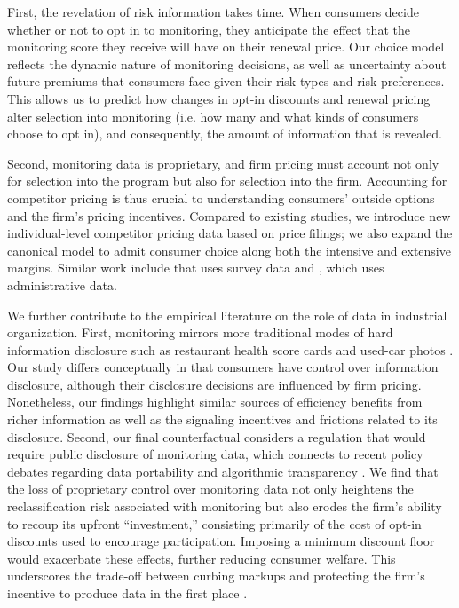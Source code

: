 First, the revelation of risk information takes time. When consumers decide whether or not to opt in to monitoring, they anticipate the effect that the monitoring score they receive will have on their renewal price. Our choice model reflects the dynamic nature of monitoring decisions, as well as uncertainty about future premiums that consumers face given their risk types and risk preferences. This allows us to predict how changes in opt-in discounts and renewal pricing alter selection into monitoring (i.e. how many and what kinds of consumers choose to opt in), and consequently, the amount of information that is revealed.

Second, monitoring data is proprietary, and firm pricing must account not only for selection into the program but also for selection into the firm. Accounting for competitor pricing is thus crucial to understanding consumers' outside options and the firm's pricing incentives. Compared to existing studies, we introduce new individual-level competitor pricing data based on price filings; we also expand the canonical model to admit consumer choice along both the intensive and extensive margins. Similar work include \textcite{Honka2012} that uses survey data and \textcite{cosconati2025competing}, which uses administrative data.

We further contribute to the empirical literature on the role of data in industrial organization.
First, monitoring mirrors more traditional modes of hard information disclosure such as restaurant health score cards \parencites{jin2003effect} and used-car photos \parencites{lewis2011asymmetric}. Our study differs conceptually in that consumers have control over information disclosure, although their disclosure decisions are influenced by firm pricing. Nonetheless, our findings highlight similar sources of efficiency benefits from richer information as well as the signaling incentives and frictions related to its disclosure.
Second, our final counterfactual considers a regulation that would require public disclosure of monitoring data, which connects to recent policy debates regarding data portability and algorithmic transparency \parencites{jin2021big}. We find that the loss of proprietary control over monitoring data not only heightens the reclassification risk associated with monitoring but also erodes the firm's ability to recoup its upfront ``investment,'' consisting primarily of the cost of opt-in discounts used to encourage participation. Imposing a minimum discount floor would exacerbate these effects, further reducing consumer welfare.
This underscores the trade-off between curbing markups and protecting the firm's incentive to produce data in the first place \parencites{Posner1978, Hermalin2006}.

